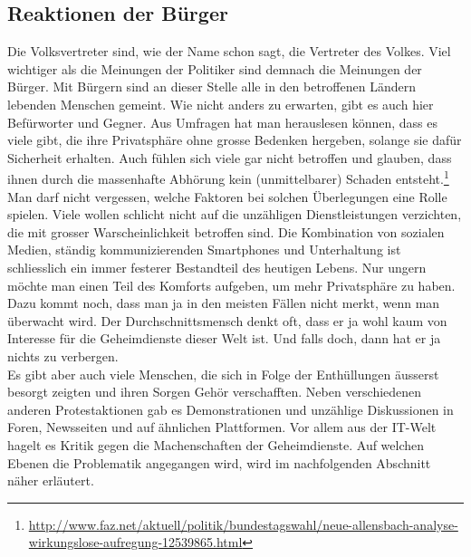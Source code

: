 \subsection{Reaktionen der Bürger}
Die Volksvertreter sind, wie der Name schon sagt, die Vertreter des Volkes. Viel wichtiger als die Meinungen der Politiker sind demnach die Meinungen der Bürger. Mit Bürgern sind an dieser Stelle alle in den betroffenen Ländern lebenden Menschen gemeint. Wie nicht anders zu erwarten, gibt es auch hier Befürworter und Gegner. Aus Umfragen hat man herauslesen können, dass es viele gibt, die ihre Privatsphäre ohne grosse Bedenken hergeben, solange sie dafür Sicherheit erhalten. Auch fühlen sich viele gar nicht betroffen und glauben, dass ihnen durch die massenhafte Abhörung kein (unmittelbarer) Schaden entsteht.\footnote{\url{http://www.faz.net/aktuell/politik/bundestagswahl/neue-allensbach-analyse-wirkungslose-aufregung-12539865.html}}
\\
Man darf nicht vergessen, welche Faktoren bei solchen Überlegungen eine Rolle spielen. Viele wollen schlicht nicht auf die unzähligen Dienstleistungen verzichten, die mit grosser Warscheinlichkeit betroffen sind. Die Kombination von sozialen Medien, ständig kommunizierenden Smartphones und Unterhaltung ist schliesslich ein immer festerer Bestandteil des heutigen Lebens. Nur ungern möchte man einen Teil des Komforts aufgeben, um mehr Privatsphäre zu haben. Dazu kommt noch, dass man ja in den meisten Fällen nicht merkt, wenn man überwacht wird. Der Durchschnittsmensch denkt oft, dass er ja wohl kaum von Interesse für die Geheimdienste dieser Welt ist. Und falls doch, dann hat er ja nichts zu verbergen.
\\
Es gibt aber auch viele Menschen, die sich in Folge der Enthüllungen äusserst besorgt zeigten und ihren Sorgen Gehör verschafften. Neben verschiedenen anderen Protestaktionen gab es Demonstrationen und unzählige Diskussionen in Foren, Newsseiten und auf ähnlichen Plattformen. Vor allem aus der IT-Welt hagelt es Kritik gegen die Machenschaften der Geheimdienste. Auf welchen Ebenen die Problematik angegangen wird, wird im nachfolgenden Abschnitt näher erläutert.

